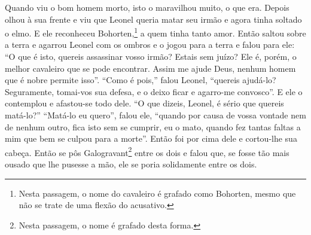 Quando viu o bom homem morto, isto o maravilhou muito, o que era. Depois olhou
à sua frente e viu que Leonel queria matar seu irmão e agora tinha soltado o
elmo. E ele reconheceu Bohorten,\footnote{ Nesta passagem, o nome do cavaleiro é
grafado como Bohorten, mesmo que não se trate de uma flexão do acusativo.}  
a quem tinha tanto amor. Então saltou sobre a terra e agarrou
Leonel com os ombros e o jogou para a terra e falou para ele: “O que é isto,
quereis assassinar vosso irmão? Estais sem juízo? Ele é, porém, o melhor
cavaleiro que se pode encontrar. Assim me ajude Deus, nenhum homem que é nobre
permite isso”. “Como é pois,” falou Leonel, “quereis ajudá-lo? Seguramente,
tomai-vos sua defesa, e o deixo ficar e agarro-me convosco”. E ele o contemplou
e afastou-se todo dele. “O que dizeis, Leonel, é sério que quereis matá-lo?”
“Matá-lo eu quero”, falou ele, “quando por causa de vossa vontade nem de nenhum
outro, fica isto sem se cumprir, eu o mato, quando fez tantas faltas a mim que
bem se culpou para a morte”. Então foi por cima dele e cortou-lhe sua cabeça.
Então se pôs Galogravant\footnote{ Nesta passagem, o nome é grafado desta forma.} 
entre os dois e falou que, se fosse tão mais ousado que lhe
pusesse a mão, ele se poria solidamente entre os dois.

